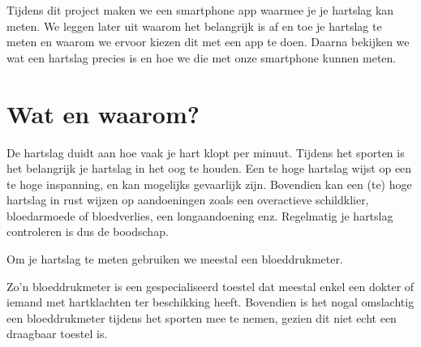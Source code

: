 \label{sec:inl}

\begin{samenvatting}
Tijdens dit project maken we een smartphone app waarmee je je hartslag kan meten. We leggen later uit waarom het belangrijk is af en toe je hartslag te meten en waarom we ervoor kiezen dit met een app te doen. Daarna bekijken we wat een hartslag precies is en hoe we die met onze smartphone kunnen meten.
\end{samenvatting}
%

\section{Wat en waarom?}
\label{sec:Mod1_Sec1}
%
De hartslag duidt aan hoe vaak je hart klopt per minuut. Tijdens het sporten is het belangrijk je hartslag in het oog te houden. Een te hoge hartslag wijst op een te hoge inspanning, en kan mogelijks gevaarlijk zijn. Bovendien kan een (te) hoge hartslag in rust wijzen op aandoeningen zoals een overactieve schildklier, bloedarmoede of bloedverlies, een longaandoening enz. Regelmatig je hartslag controleren is dus de boodschap.

Om je hartslag te meten gebruiken we meestal een bloeddrukmeter.

\begin{minipage}{.5\linewidth}
\end{minipage} 
\begin{minipage}{.5\linewidth}
\end{minipage} 

Zo'n bloeddrukmeter is een gespecialiseerd toestel dat meestal enkel een dokter of iemand met hartklachten ter beschikking heeft. Bovendien is het nogal omslachtig een bloeddrukmeter tijdens het sporten mee te nemen, gezien dit niet echt een draagbaar toestel is.


